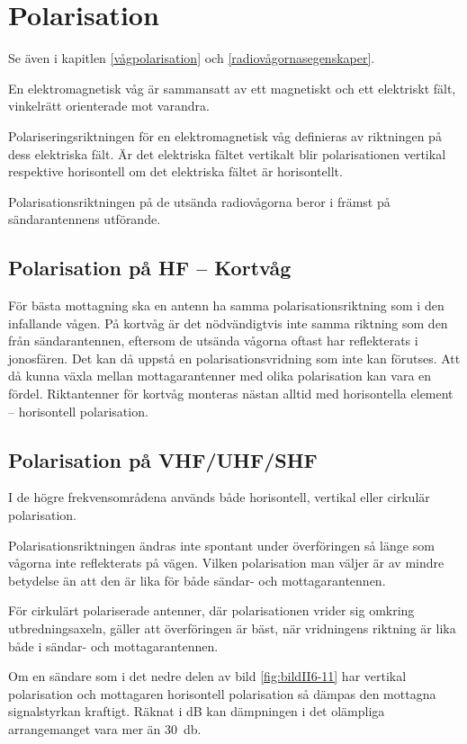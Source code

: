 \section{Polarisation}

Se även i kapitlen \ref{vågpolarisation} och \ref{radiovågornasegenskaper}.

En elektromagnetisk våg är sammansatt av ett magnetiskt och ett
elektriskt fält, vinkelrätt orienterade mot varandra.

Polariseringsriktningen för en elektromagnetisk våg definieras av riktningen på
dess elektriska fält.
Är det elektriska fältet vertikalt blir polarisationen vertikal respektive
horisontell om det elektriska fältet är horisontellt.

Polarisationsriktningen på de utsända radiovågorna beror i främst på
sändarantennens utförande.

\subsection{Polarisation på HF -- Kortvåg}
För bästa mottagning ska en antenn ha samma polarisationsriktning som i den
infallande vågen.
På kortvåg är det nödvändigtvis inte samma riktning som den från
sändarantennen, eftersom de utsända vågorna oftast har reflekterats i
jonosfären.
Det kan då uppstå en polarisationsvridning som inte kan förutses.
Att då kunna växla mellan mottagarantenner med olika polarisation kan vara en
fördel.
Riktantenner för kortvåg monteras nästan alltid med horisontella element --
horisontell polarisation.

\subsection{Polarisation på VHF/UHF/SHF}


I de högre frekvensområdena används både horisontell, vertikal eller
cirkulär polarisation.

Polarisationsriktningen ändras inte spontant under överföringen så
länge som vågorna inte reflekterats på vägen.
Vilken polarisation man väljer är av mindre betydelse än att den är lika
för både sändar- och mottagarantennen.

För cirkulärt polariserade antenner, där polarisationen vrider sig
omkring utbredningsaxeln, gäller att överföringen är bäst, när
vridningens riktning är lika både i sändar- och mottagarantennen.

Om en sändare som i det nedre delen av bild \ref{fig:bildII6-11} har vertikal
polarisation och mottagaren horisontell polarisation så dämpas den mottagna
signalstyrkan kraftigt.
Räknat i dB kan dämpningen i det olämpliga arrangemanget vara mer än
\SI{30}{\decibel}.
